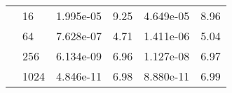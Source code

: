 \begin{table}[H]
\begin{center}
{\begin{tabular}{llllll}
  & 16 & 1.995e-05 & 9.25 & 4.649e-05 & 8.96\\
  & 64 & 7.628e-07 & 4.71 & 1.411e-06 & 5.04\\
  & 256 & 6.134e-09 & 6.96 & 1.127e-08 & 6.97\\
  & 1024 & 4.846e-11 & 6.98 & 8.880e-11 & 6.99\\
%

\end{tabular}}
\end{center}
\end{table}
